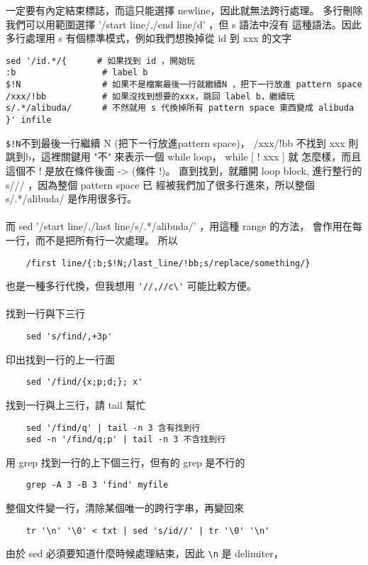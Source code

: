    一定要有內定結束標誌，而這只能選擇 newline，因此就無法跨行處理。
    多行刪除我們可以用範圍選擇 '/start line/,/end line/d' ，但 s 語法中沒有
    這種語法。因此多行處理用 s 有個標準模式，例如我們想換掉從 id 到 xxx 的文字
    \begin{verbatim}
sed '/id.*/{      # 如果找到 id ，開始玩
:b                 # label b
$!N                # 如果不是檔案最後一行就繼續N ，把下一行放進 pattern space
/xxx/!bb           # 如果沒找到想要的xxx，跳回 label b，繼續玩
s/.*/alibuda/      # 不然就用 s 代換掉所有 pattern space 東西變成 alibuda
}' infile
    \end{verbatim}
    \verb=$!N=不到最後一行繼續 N (把下一行放進pattern space)， /xxx/!bb 不找到
    xxx 則跳到b，這裡關鍵用 "不" 來表示一個 while loop， while [ ! xxx ] 就
    怎麼樣，而且這個不 ! 是放在條件後面 -> (條件 !)。
    直到找到，就離開 loop block, 進行整行的 s/// ，因為整個 pattern space 已
    經被我們加了很多行進來，所以整個 s/.*/alibuda/ 是作用很多行。
    \\\\
    而 sed '/start line/,/last line/{s/.*/alibuda/}' ，用這種 range 的方法，
    會作用在每一行，而不是把所有行一次處理。 所以
    \begin{verbatim}
    /first line/{:b;$!N;/last_line/!bb;s/replace/something/}
    \end{verbatim}
    也是一種多行代換，但我想用 \verb='//,//c\'= 可能比較方便。
    \\\\
    找到一行與下三行
    \begin{verbatim}
    sed 's/find/,+3p'
    \end{verbatim}
    印出找到一行的上一行面
    \begin{verbatim}
    sed '/find/{x;p;d;}; x'
    \end{verbatim}
    找到一行與上三行，請 tail 幫忙
    \begin{verbatim}
    sed '/find/q' | tail -n 3 含有找到行
    sed -n '/find/q;p' | tail -n 3 不含找到行
    \end{verbatim}
    用 grep 找到一行的上下個三行，但有的 grep 是不行的
    \begin{verbatim}
    grep -A 3 -B 3 'find' myfile
    \end{verbatim}
    整個文件變一行，清除某個唯一的跨行字串，再變回來
    \begin{verbatim}
    tr '\n' '\0' < txt | sed 's/id//' | tr '\0' '\n'
    \end{verbatim}
    由於 sed 必須要知道什麼時候處理結束，因此 \verb=\n= 是 delimiter，
